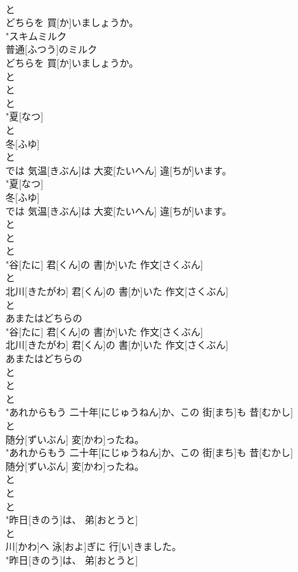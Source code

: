 \documentclass[8pt]{extreport}
\begin{document}
\begin{CJK}{UTF8}{min}
\\	と
\\	どちらを 買[か]いましょうか。
\\	"スキムミルク
\\	普通[ふつう]のミルク
\\	どちらを 買[か]いましょうか。
\\	と 
\\	と 
\\	と
\\	"夏[なつ]
\\	と
\\	冬[ふゆ]
\\	と
\\	では 気温[きぶん]は 大変[たいへん] 違[ちが]います。
\\	"夏[なつ]
\\	冬[ふゆ]
\\	では 気温[きぶん]は 大変[たいへん] 違[ちが]います。
\\	と 
\\	と 
\\	と
\\	"谷[たに] 君[くん]の 書[か]いた 作文[さくぶん]
\\	と
\\	北川[きたがわ] 君[くん]の 書[か]いた 作文[さくぶん]
\\	と
\\	あまたはどちらの
\\	"谷[たに] 君[くん]の 書[か]いた 作文[さくぶん]
\\	北川[きたがわ] 君[くん]の 書[か]いた 作文[さくぶん]
\\	あまたはどちらの
\\	と 
\\	と 
\\	と
\\	"あれからもう 二十年[にじゅうねん]か、この 街[まち]も 昔[むかし]
\\	と
\\	随分[ずいぶん] 変[かわ]ったね。
\\	"あれからもう 二十年[にじゅうねん]か、この 街[まち]も 昔[むかし]
\\	随分[ずいぶん] 変[かわ]ったね。
\\	と 
\\	と 
\\	と
\\	"昨日[きのう]は、 弟[おとうと]
\\	と
\\	川[かわ]へ 泳[およ]ぎに 行[い]きました。
\\	"昨日[きのう]は、 弟[おとうと]

\end{CJK}
\end{document}
